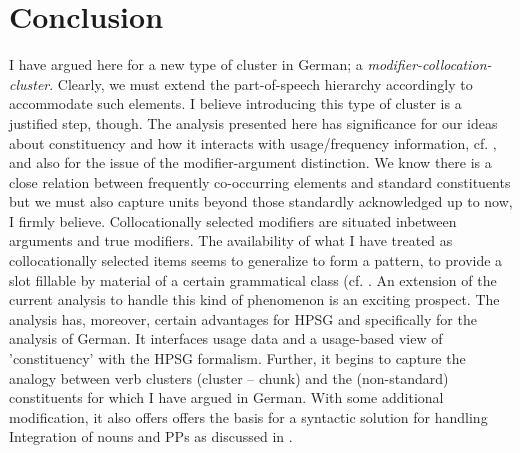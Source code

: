 \documentclass[11pt,a4paper,fleqn]{article}
\begin{document}
\section{Conclusion}

I have argued here for a new type of cluster in German; a \textit{modifier-collocation-cluster}. Clearly, we must 
extend the part-of-speech hierarchy accordingly to accommodate such elements. I believe introducing this type of cluster
is a justified step, though. The analysis presented here has significance for our ideas about constituency and how it interacts with
usage/frequency information, cf. \cite{BybeeTorres2009, BecknerBybee2009, Bod1998}, and also for the issue of the modifier-argument distinction. We know there is a close relation between frequently co-occurring elements and standard constituents but we must also capture units beyond those standardly
acknowledged up to now, I firmly believe. Collocationally selected modifiers are situated inbetween arguments and true modifiers.
The availability of what I have treated as collocationally selected items seems to generalize to form a pattern, to provide a slot fillable by material of a 
certain grammatical class (cf. \cite{Dowty2003}. An extension of the current analysis to handle this kind of phenomenon is an exciting prospect.
The analysis has, moreover, certain advantages for HPSG and specifically for the analysis of German. It interfaces usage data and a usage-based 
view of 'constituency' with the HPSG formalism. Further, it begins to capture the
 analogy between verb clusters (cluster -- chunk) and the (non-standard) constituents for which I have argued in German. 
With some additional modification, it also offers offers the basis for a syntactic solution for handling Integration of nouns and PPs as discussed in
\citep{Jacobs1993, Jacobs1999}. 

 

\end{document}

